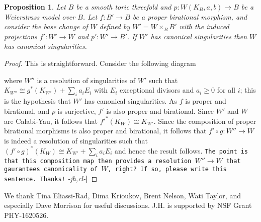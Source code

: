 \documentclass[aps,prl,twocolumn, superscriptaddress,groupedaddress,nofootinbib]{revtex4-1}
\newtheorem{prop}{Proposition}
\newcommand{\XXX}[3]{{\color{blue}{\bf [#1: } {\tt #3} {\it -#2-}{\bf ]}}}
\begin{document}
\begin{prop}
\label{prop:pullback}
Let $B$ be a smooth toric threefold and $p \colon W(K_{B},a,b) \rightarrow B$ be a Weierstrass model over $B$. Let $f \colon B' \rightarrow B$ be a proper birational morphism, and consider the base change of $W$ defined by $W' = W\times_{B}B'$ with the induced projections $f' : W' \rightarrow W$ and $p' \colon W' \rightarrow B'$. If $W'$ has canonical singularities then $W$ has canonical singularities. 
\end{prop}
\begin{proof}
This is straightforward. Consider the following diagram
\begin{center}
\end{center}
where $W''$ is a resolution of singularities of $W'$ such that $K_{W''} \cong  g^{*}(K_{W'})+ \sum_{i}a_{i}E_{i}$ with $E_{i}$ exceptional divisors and $a_{i} \geq 0$ for all $i$; this is the hypothesis that $W'$ has canonical singularities. As $f$ is proper and birational, and $p$ is surjective, $f'$ is also proper and birational. Since $W'$ and $W$ are Calabi-Yau, it follows that $f'^{*}(K_{W}) \cong K_{W'}$. Since the composition of proper birational morphisms is also proper and birational, it follows that $f'\circ g\colon W'' \rightarrow W$ is indeed a resolution of singularities such that $(f'\circ g)^{*}(K_{W}) \cong K_{W'} + \sum_{i}a_{i}E_{i}$ and hence the result follows.
\XXX{bs}{jh,cl}{The point is that this composition map then provides a
resolution $W''\to W$ that gaurantees canonicality of $W$, right? If so, please write
this sentence. Thanks!}
\end{proof}
\vspace{.2cm}
 We thank Tina Eliassi-Rad, Dima Krioukov, Brent Nelson, Wati Taylor,
and especially Dave Morrison for useful discussions. 
J.H. is supported by
NSF Grant PHY-1620526.


\end{document}
